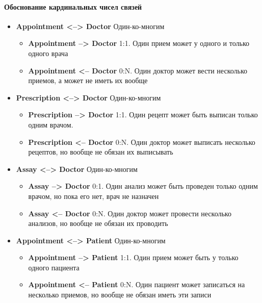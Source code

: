 \documentclass[a4paper, 14pt]{extarticle}
\begin{document}
\paragraph{Обоснование кардинальных чисел связей}
\begin{itemize}

    \item \textbf{Appointment <--> Doctor} Один-ко-многим
    \begin{itemize}
        \item \textbf{Appointment --> Doctor} 1:1. Один прием может у одного и только одного врача
        \item \textbf{Appointment <-- Doctor} 0:N. Один доктор может вести несколько приемов, а может не иметь их вообще
    \end{itemize}

    \item \textbf{Prescription <--> Doctor} Один-ко-многим
    \begin{itemize}
        \item \textbf{Prescription --> Doctor} 1:1. Один рецепт может быть выписан только одним врачом.
        \item \textbf{Prescription <-- Doctor} 0:N. Один доктор может выписать несколько рецептов, но вообще не обязан их выписывать
    \end{itemize}

    \item \textbf{Assay <--> Doctor} Один-ко-многим
    \begin{itemize}
        \item \textbf{Assay --> Doctor} 0:1. Один анализ может быть проведен только одним врачом, но пока его нет, врач не назначен
        \item \textbf{Assay <-- Doctor} 0:N. Один доктор может провести несколько анализов, но вообще не обязан их проводить
    \end{itemize}


    \item \textbf{Appointment <--> Patient} Один-ко-многим
    \begin{itemize}
        \item \textbf{Appointment --> Patient} 1:1. Один прием может быть у только одного пациента
        \item \textbf{Appointment <-- Patient} 0:N. Один пациент может записаться на несколько приемов, но вообще не обязан иметь эти записи
    \end{itemize}


\end{itemize}
\end{document}
